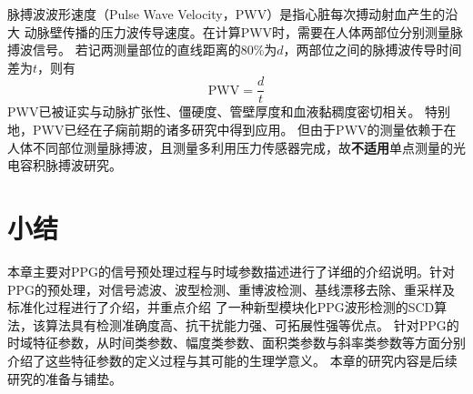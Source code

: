 脉搏波波形速度（Pulse Wave Velocity，PWV）是指心脏每次搏动射血产生的沿大
动脉壁传播的压力波传导速度\cite{Van2012}。在计算PWV时，需要在人体两部位分别测量脉搏波信号。
若记两测量部位的直线距离的80\%为$d$，两部位之间的脉搏波传导时间差为$t$，则有
\begin{equation}
    \label{equ:pwv}
    \text{PWV} = \frac{d}{t}
\end{equation}
PWV已被证实与动脉扩张性、僵硬度、管壁厚度和血液黏稠度密切相关。
特别地，PWV已经在子痫前期的诸多研究中得到应用\cite{Tomsin2012,Katsipi2014,VivianaIvan2018,Ira2014}。
但由于PWV的测量依赖于在人体不同部位测量脉搏波，且测量多利用压力传感器完成，故\textbf{不适用}单点测量的光电容积脉搏波研究。

\section{小结}
本章主要对PPG的信号预处理过程与时域参数描述进行了详细的介绍说明。针对PPG的预处理，对信号滤波、波型检测、重博波检测、基线漂移去除、重采样及标准化过程进行了介绍，并重点介绍
了一种新型模块化PPG波形检测的SCD算法，该算法具有检测准确度高、抗干扰能力强、可拓展性强等优点。
针对PPG的时域特征参数，从时间类参数、幅度类参数、面积类参数与斜率类参数等方面分别介绍了这些特征参数的定义过程与其可能的生理学意义。
本章的研究内容是后续研究的准备与铺垫。